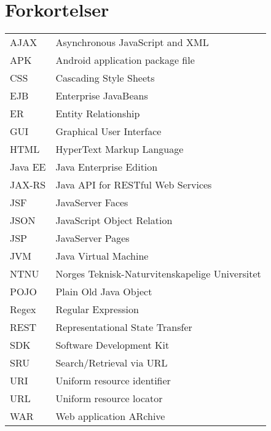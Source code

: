 \documentclass[../main.tex]{subfiles}
\begin{document}
\section*{Forkortelser}
\begin{tabular}{ p{2cm} l  }
AJAX	 & Asynchronous JavaScript and XML\\
APK & Android application package file\\
CSS & Cascading Style Sheets\\
EJB & Enterprise JavaBeans\\
ER & Entity Relationship\\
GUI & Graphical User Interface\\
HTML & HyperText Markup Language\\
Java EE & Java Enterprise Edition\\
JAX-RS & Java API for RESTful Web Services\\
JSF & JavaServer Faces\\
JSON & JavaScript Object Relation\\
JSP & JavaServer Pages\\
JVM & Java Virtual Machine\\
NTNU & Norges Teknisk-Naturvitenskapelige Universitet\\
POJO & Plain Old Java Object\\
Regex & Regular Expression\\
REST & Representational State Transfer\\
SDK & Software Development Kit\\
SRU & Search/Retrieval via URL\\
URI & Uniform resource identifier\\
URL & Uniform resource locator\\
WAR & Web application ARchive\\
\end{tabular}


\newpage
\end{document}
